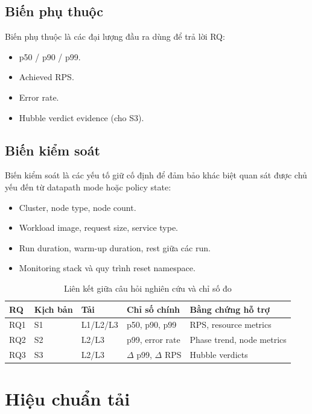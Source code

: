 \subsection{Biến phụ thuộc}
Biến phụ thuộc là các đại lượng đầu ra dùng để trả lời RQ:
\begin{itemize}
  \item p50 / p90 / p99.
  \item Achieved RPS.
  \item Error rate.
  \item Hubble verdict evidence (cho S3).
\end{itemize}

\subsection{Biến kiểm soát}
Biến kiểm soát là các yếu tố giữ cố định để đảm bảo khác biệt quan sát được chủ yếu đến từ datapath mode hoặc policy state:
\begin{itemize}
  \item Cluster, node type, node count.
  \item Workload image, request size, service type.
  \item Run duration, warm-up duration, rest giữa các run.
  \item Monitoring stack và quy trình reset namespace.
\end{itemize}

\begin{table}[H]
\centering
\caption{Liên kết giữa câu hỏi nghiên cứu và chỉ số đo}
\label{tab:ch3-rq-metric-traceability}
\small
\setlength{\tabcolsep}{5pt}
\renewcommand{\arraystretch}{1.15}
\begin{tabularx}{\textwidth}{>{\raggedright\arraybackslash}p{1.1cm} >{\raggedright\arraybackslash}p{1.4cm} >{\raggedright\arraybackslash}p{1.7cm} >{\raggedright\arraybackslash}p{2.6cm} X}
\toprule
\textbf{RQ} & \textbf{Kịch bản} & \textbf{Tải} & \textbf{Chỉ số chính} & \textbf{Bằng chứng hỗ trợ} \\
\midrule
RQ1 & S1 & L1/L2/L3 & p50, p90, p99 & RPS, resource metrics \\
RQ2 & S2 & L2/L3 & p99, error rate & Phase trend, node metrics \\
RQ3 & S3 & L2/L3 & $\Delta$ p99, $\Delta$ RPS & Hubble verdicts \\
\bottomrule
\end{tabularx}
\end{table}

\section{Hiệu chuẩn tải}
\label{sec:load-calibration}

